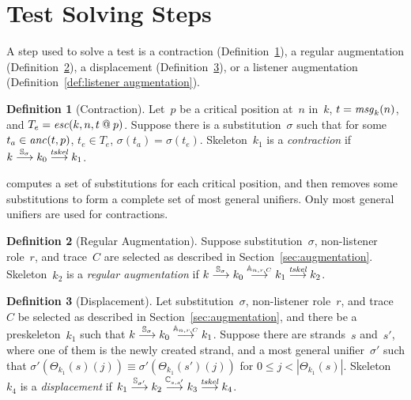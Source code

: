 \documentclass[12pt]{report}
\theoremstyle{definition}
\newtheorem{defn}{Definition}[chapter]
\newcommand{\msg}{\fn{msg}}
\begin{document}
\section{Test Solving Steps}

A step used to solve a test is a contraction
(Definition~\ref{def:contraction}), a regular augmentation
(Definition~\ref{def:regular augmentation}), a displacement
(Definition~\ref{def:displacement}), or a listener augmentation
(Definition~\ref{def:listener augmentation}).

\begin{defn}[Contraction]\label{def:contraction}
Let~$p$ be a critical position
at~$n$ in~$k$, $t=\msg_k(n)$, and $T_e= \operatorname{\mathit{esc}}(k,n,t\mathbin{@} p)$.
Suppose there is a substitution~$\sigma$ such that for
some~$t_a\in\operatorname{\mathit{anc}}(t,p)$, $t_e\in T_e$, $\sigma(t_a)=\sigma(t_e)$.
Skeleton~$k_1$ is a \emph{contraction} if
$k\stackrel{\mathbb S_\sigma}{\longrightarrow}k_0\stackrel{\operatorname{\mathit{tskel}}}{\longrightarrow}k_1$.
\end{defn}

{\cpsa} computes a set of substitutions for each critical position, and
then removes some substitutions to form a complete set of most
general unifiers.  Only most general unifiers are used for
contractions.

\begin{defn}[Regular Augmentation]\label{def:regular augmentation}
Suppose substitution~$\sigma$, non-listener role~$r$, and trace~$C$
are selected as described in Section~\ref{sec:augmentation}.
Skeleton~$k_2$ is a \emph{regular
  augmentation} if
$k\stackrel{\mathbb S_\sigma}{\longrightarrow}k_0\stackrel{\mathbb A_{n,r,C}}{\longrightarrow}k_1
\stackrel{\operatorname{\mathit{tskel}}}{\longrightarrow}k_2$.
\end{defn}

\begin{defn}[Displacement]\label{def:displacement}
Let substitution~$\sigma$, non-listener role~$r$, and trace~$C$ be
selected as described in Section~\ref{sec:augmentation}, and there be
a preskeleton~$k_1$ such that
$k\stackrel{\mathbb S_\sigma}{\longrightarrow}k_0\stackrel{\mathbb A_{n,r,C}}{\longrightarrow}k_1$.
Suppose there are strands~$s$ and~$s'$, where one of them is the newly
created strand, and a most general unifier~$\sigma'$ such that
$\sigma'(\Theta_{k_1}(s)(j))\equiv \sigma'(\Theta_{k_1}(s')(j))$ for
$0\leq j<|\Theta_{k_1}(s)|$.  Skeleton~$k_4$ is a
\emph{displacement} if
$k_1\stackrel{\mathbb S_{\sigma'}}{\longrightarrow}k_2\stackrel{\mathbb C_{s,s'}}{\longrightarrow}k_3
\stackrel{\operatorname{\mathit{tskel}}}{\longrightarrow}k_4$.
\end{defn}
\end{document}
